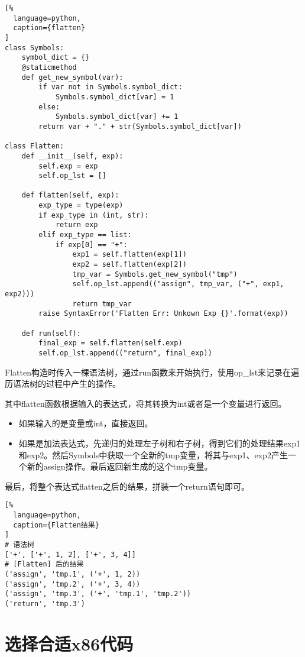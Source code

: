 \begin{lstlisting}[%
  language=python,
  caption={flatten}
]
class Symbols:
    symbol_dict = {}
    @staticmethod
    def get_new_symbol(var):
        if var not in Symbols.symbol_dict:
            Symbols.symbol_dict[var] = 1
        else:
            Symbols.symbol_dict[var] += 1
        return var + "." + str(Symbols.symbol_dict[var])

class Flatten:
    def __init__(self, exp):
        self.exp = exp
        self.op_lst = []
    
    def flatten(self, exp):
        exp_type = type(exp)
        if exp_type in (int, str):
            return exp
        elif exp_type == list:
            if exp[0] == "+":
                exp1 = self.flatten(exp[1])
                exp2 = self.flatten(exp[2])
                tmp_var = Symbols.get_new_symbol("tmp")
                self.op_lst.append(("assign", tmp_var, ("+", exp1, exp2)))
                return tmp_var
        raise SyntaxError('Flatten Err: Unkown Exp {}'.format(exp))

    def run(self):
        final_exp = self.flatten(self.exp)
        self.op_lst.append(("return", final_exp))
\end{lstlisting}

Flatten构造时传入一棵语法树，通过run函数来开始执行，使用op\_lst来记录在遍历语法树的过程中产生的操作。

其中flatten函数根据输入的表达式，将其转换为int或者是一个变量进行返回。
\begin{itemize}
  \item 如果输入的是变量或int，直接返回。
  \item 如果是加法表达式，先递归的处理左子树和右子树，得到它们的处理结果exp1和exp2。然后Symbols中获取一个全新的tmp变量，将其与exp1、exp2产生一个新的assign操作。最后返回新生成的这个tmp变量。
\end{itemize}

最后，将整个表达式flatten之后的结果，拼装一个return语句即可。

\begin{lstlisting}[%
  language=python,
  caption={Flatten结果}
]
# 语法树
['+', ['+', 1, 2], ['+', 3, 4]]
# [Flatten] 后的结果
('assign', 'tmp.1', ('+', 1, 2))
('assign', 'tmp.2', ('+', 3, 4))
('assign', 'tmp.3', ('+', 'tmp.1', 'tmp.2'))
('return', 'tmp.3')
\end{lstlisting}

\section{选择合适x86代码}

